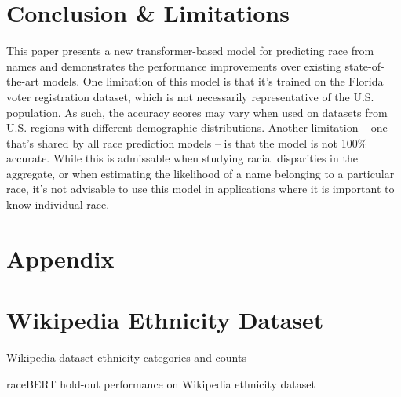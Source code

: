\documentclass[11pt]{article}
\begin{document}
\section{Conclusion \& Limitations}
This paper presents a new transformer-based model for predicting race from names and demonstrates the performance improvements over existing state-of-the-art models.
One limitation of this model is that it's trained on the Florida voter registration dataset, which is not necessarily representative of the U.S. population. 
As such, the accuracy scores may vary when used on datasets from U.S. regions with different demographic distributions. 
Another limitation -- one that's shared by all race prediction models -- is that the model is not 100\% accurate.
While this is admissable when studying racial disparities in the aggregate, or when estimating the likelihood of a name belonging to a particular race, it's not advisable to use this model in applications where it is important to know individual race.
 
\pagebreak

\printbibliography

\pagebreak

\section*{Appendix}
\appendix

\section{Wikipedia Ethnicity Dataset}

\begin{table}[H]
 \centering
 
 \label{tab:ethnicity_counts}
 \caption{Wikipedia dataset ethnicity categories and counts}
\end{table}

\begin{table}[H]
 \centering
 \scalebox{0.8}{}
 \label{tab:ethnicty_performance}
 \caption{raceBERT hold-out performance on Wikipedia ethnicity dataset}
\end{table}
\end{document}
